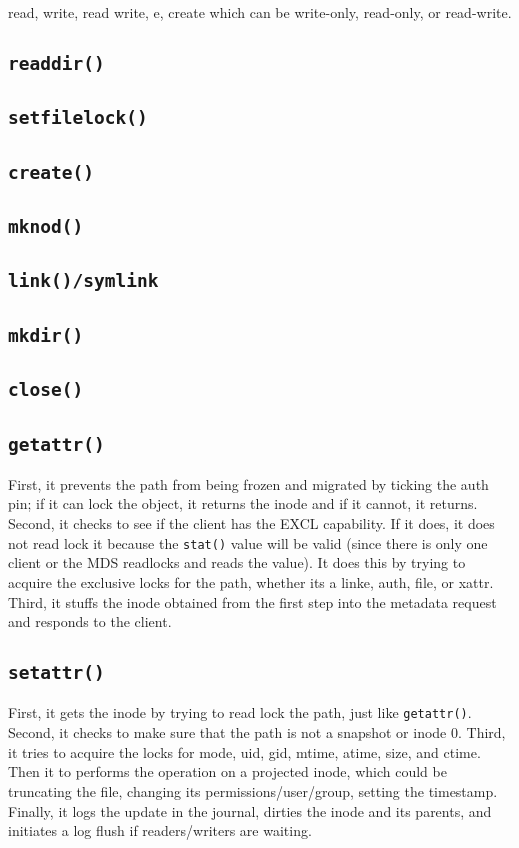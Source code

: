 \documentclass[conference]{acm_proc_article-sp} \usepackage[english]{babel}
\begin{document}
read, write, read write, e, create which can be write-only, read-only, or
read-write. 

\subsection{\texttt{readdir()}} \subsection{\texttt{setfilelock()}}

\subsection{\texttt{create()}} \subsection{\texttt{mknod()}}

\subsection{\texttt{link()/symlink }} \subsection{\texttt{mkdir()}}

\subsection{\texttt{close()}}

\subsection{\texttt{getattr()}} First, it prevents the path from being frozen
and migrated by ticking the auth pin; if it can lock the object, it returns the
inode and if it cannot, it returns. Second, it checks to see if the client has
the EXCL capability. If it does, it does not read lock it because the
\texttt{stat()} value will be valid (since there is only one client or the MDS
readlocks and reads the value). It does this by trying to acquire the exclusive
locks for the path, whether its a linke, auth, file, or xattr. Third, it stuffs
the inode obtained from the first step into the metadata request and responds
to the client.

\subsection{\texttt{setattr()}} First, it gets the inode by trying to read lock
the path, just like \texttt{getattr()}. Second, it checks to make sure that the
path is not a snapshot or inode 0. Third, it tries to acquire the locks for
mode, uid, gid, mtime, atime, size, and ctime. Then it to performs the
operation on a projected inode, which could be truncating the file, changing
its permissions/user/group, setting the timestamp. Finally, it logs the update
in the journal, dirties the inode and its parents, and initiates a log flush if
readers/writers are waiting.
\end{document}
